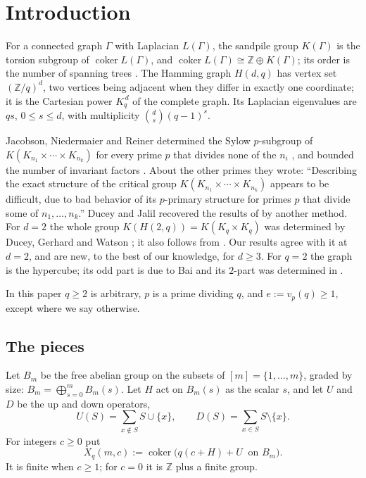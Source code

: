 \documentclass[10pt]{article}
\theoremstyle{ds}
\theoremstyle{dsrem}
\newcommand{\Z}{\mathbb{Z}}
\newcommand{\coker}{\operatorname{coker}}
\begin{document}


\section{Introduction}

For a connected graph $\Gamma$ with Laplacian $L(\Gamma)$, the sandpile group $K(\Gamma)$ is the torsion subgroup of $\coker L(\Gamma)$, and $\coker L(\Gamma)\cong\Z\oplus K(\Gamma)$; its order is the number of spanning trees \cite{Big}. The Hamming graph $H(d,q)$ has vertex set $(\Z/q)^d$, two vertices being adjacent when they differ in exactly one coordinate; it is the Cartesian power $K_q^{\,d}$ of the complete graph. Its Laplacian eigenvalues are $qs$, $0\le s\le d$, with multiplicity $\binom ds(q-1)^s$.

Jacobson, Niedermaier and Reiner \cite{JNR} determined the Sylow $p$-subgroup of $K(K_{n_1}\times\cdots\times K_{n_k})$ for every prime $p$ that divides none of the $n_i$ \cite[Theorem~2]{JNR}, and bounded the number of invariant factors \cite[Theorem~3]{JNR}. About the other primes they wrote: ``Describing the exact structure of the critical group $K(K_{n_1}\times\cdots\times K_{n_k})$ appears to be difficult, due to bad behavior of its $p$-primary structure for primes $p$ that divide some of $n_1,\dots,n_k$.'' Ducey and Jalil \cite{DJ} recovered the results of \cite{JNR} by another method. For $d=2$ the whole group $K(H(2,q))=K(K_q\times K_q)$ was determined by Ducey, Gerhard and Watson \cite[Theorem~1.1]{DGW}; it also follows from \cite[Theorem~13 and Example~11]{JNR}. Our results agree with it at $d=2$, and are new, to the best of our knowledge, for $d\ge3$. For $q=2$ the graph is the hypercube; its odd part is due to Bai \cite{Bai} and its $2$-part was determined in \cite{DST}.

In this paper $q\ge2$ is arbitrary, $p$ is a prime dividing $q$, and $e:=v_p(q)\ge1$, except where we say otherwise.

\subsection{The pieces}
Let $B_m$ be the free abelian group on the subsets of $[m]=\{1,\dots,m\}$, graded by size: $B_m=\bigoplus_{s=0}^m B_m(s)$. Let $H$ act on $B_m(s)$ as the scalar $s$, and let $U$ and $D$ be the up and down operators,
\[
U(S)=\sum_{x\notin S}S\cup\{x\},\qquad D(S)=\sum_{x\in S}S\setminus\{x\}.
\]
For integers $c\ge0$ put
\[
X_q(m,c):=\coker\big(q(c+H)+U\ \text{ on } B_m\big).
\]
It is finite when $c\ge1$; for $c=0$ it is $\Z$ plus a finite group.
\end{document}
